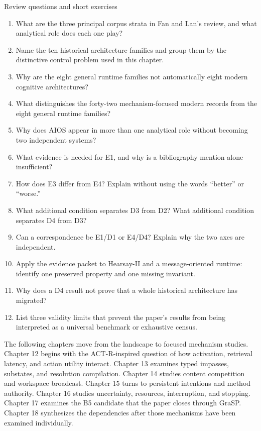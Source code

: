 \begin{reviewquestions}{Review questions and short exercises}
\begin{enumerate}
  \item What are the three principal corpus strata in Fan and Lan's review, and what analytical role does each one play?
  \item Name the ten historical architecture families and group them by the distinctive control problem used in this chapter.
  \item Why are the eight general runtime families not automatically eight modern cognitive architectures?
  \item What distinguishes the forty-two mechanism-focused modern records from the eight general runtime families?
  \item Why does AIOS appear in more than one analytical role without becoming two independent systems?
  \item What evidence is needed for E1, and why is a bibliography mention alone insufficient?
  \item How does E3 differ from E4? Explain without using the words ``better'' or ``worse.''
  \item What additional condition separates D3 from D2? What additional condition separates D4 from D3?
  \item Can a correspondence be E1/D1 or E4/D4? Explain why the two axes are independent.
  \item Apply the evidence packet to Hearsay-II and a message-oriented runtime: identify one preserved property and one missing invariant.
  \item Why does a D4 result not prove that a whole historical architecture has migrated?
  \item List three validity limits that prevent the paper's results from being interpreted as a universal benchmark or exhaustive census.
\end{enumerate}
\end{reviewquestions}

The following chapters move from the landscape to focused mechanism studies. Chapter 12 begins with the ACT-R-inspired question of how activation, retrieval latency, and action utility interact. Chapter 13 examines typed impasses, substates, and resolution compilation. Chapter 14 studies content competition and workspace broadcast. Chapter 15 turns to persistent intentions and method authority. Chapter 16 studies uncertainty, resources, interruption, and stopping. Chapter 17 examines the B5 candidate that the paper closes through GraSP. Chapter 18 synthesizes the dependencies after those mechanisms have been examined individually.

